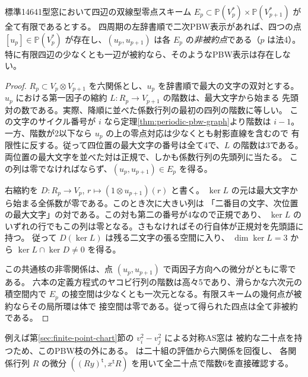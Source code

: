 \begin{corollary}\label{cor:pbw-nonreduced-four-cycle}
標準14641型窓において四辺の双線型零点スキーム
$E_p\subset\mathbb P(V_p^*)\times\mathbb P(V_{p+1}^*)$ が全て有限であるとする。
四周期の左辞書順で二次PBW表示があれば、四つの点 $[u_p]\in\mathbb P(V_p^*)$
が存在し、$(u_p,u_{p+1})$ は各 $E_p$ の\emph{非被約点}である（$p$ は法4）。
特に有限四辺の少なくとも一辺が被約なら、そのようなPBW表示は存在しない。
\end{corollary}
\begin{proof}
$R_p\subset V_p\otimes V_{p+1}$ を六関係とし、$u_p$ を辞書順で最大の文字の双対とする。
$u_p$ における第一因子の縮約 $L:R_p\to V_{p+1}$ の階数は、最大文字から始まる
先頭対の数である。実際、降順に並べた係数行列の最初の四列の階数に等しい。
この文字のサイクル番号が $i$ なら定理\ref{thm:periodic-pbw-graph}より階数は $i-1$。
一方、階数が2以下なら $u_p$ の上の零点対応は少なくとも射影直線を含むので
有限性に反する。従って四位置の最大文字の番号は全て4で、$L$ の階数は3である。
両位置の最大文字を並べた対は正規で、しかも係数行列の先頭列に当たる。
この列は零でなければならず、$(u_p,u_{p+1})\in E_p$ を得る。

右縮約を $D:R_p\to V_p$, $r\mapsto(1\otimes u_{p+1})(r)$ と書く。
$\ker L$ の元は最大文字から始まる全係数が零である。このとき次に大きい列は
「二番目の文字、次位置の最大文字」の対である。この対も第二の番号が4なので正規であり、
$\ker L$ のいずれの行でもこの列は零となる。さもなければその行自体が正規対を先頭語に持つ。
従って $D(\ker L)$ は残る二文字の張る空間に入り、
$\dim\ker L=3$ から $\ker L\cap\ker D\ne0$ を得る。

この共通核の非零関係は、点 $(u_p,u_{p+1})$ で両因子方向への微分がともに零である。
六本の定義方程式のヤコビ行列の階数は高々5であり、滑らかな六次元の積空間内で
$E_p$ の接空間は少なくとも一次元となる。有限スキームの幾何点が被約ならその局所環は体で
接空間は零である。従って得られた四点は全て非被約である。
\end{proof}

例えば第\ref{sec:finite-point-chart}節の $v_i^2-v_j^2$ による対称AS窓は
被約な二十点を持つため、このPBW枝の外にある。
 は二十組の評価から六関係を回復し、
各関係行列 $R$ の微分 $((R y)^{\mathsf t},x^{\mathsf t} R)$ を用いて全二十点で階数6を直接確認する。

